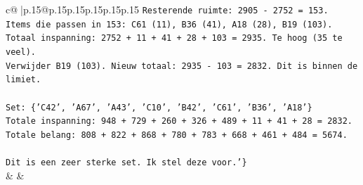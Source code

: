 \documentclass{article}
\begin{document}
{\begin{supertabular}{c@{$\;$}|p{.15\linewidth}@{}p{.15\linewidth}p{.15\linewidth}p{.15\linewidth}p{.15\linewidth}p{.15\linewidth}}
{{{\texttt{Resterende ruimte: 2905 {-} 2752 = 153.} \\
\texttt{Items die passen in 153: C61 (11), B36 (41), A18 (28), B19 (103).} \\
\texttt{Totaal inspanning: 2752 + 11 + 41 + 28 + 103 = 2935. Te hoog (35 te veel).} \\
\texttt{Verwijder B19 (103). Nieuw totaal: 2935 {-} 103 = 2832. Dit is binnen de limiet.} \\
\\ 
\texttt{Set: \{'C42', 'A67', 'A43', 'C10', 'B42', 'C61', 'B36', 'A18'\}} \\
\texttt{Totale inspanning: 948 + 729 + 260 + 326 + 489 + 11 + 41 + 28 = 2832.} \\
\texttt{Totale belang: 808 + 822 + 868 + 780 + 783 + 668 + 461 + 484 = 5674.} \\
\\ 
\texttt{Dit is een zeer sterke set. Ik stel deze voor.'\}} \\
            }
        }
    }
    & & \\ \\


\end{supertabular}}
\end{document}

